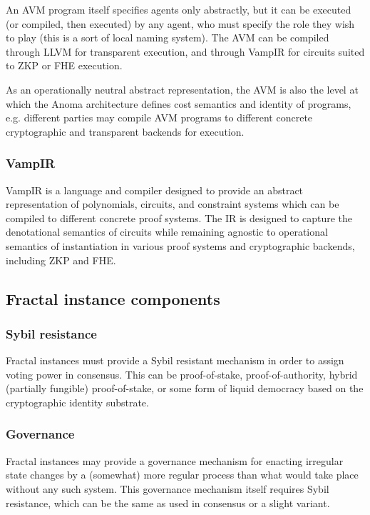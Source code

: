 \documentclass[
    9pt,            %
    commun,        %
    affiltop,       %
]{art}
\begin{document}
An AVM program itself specifies agents only abstractly, but it can be
executed (or compiled, then executed) by any agent, who must specify the
role they wish to play (this is a sort of local naming system). The AVM
can be compiled through LLVM for transparent execution, and through
VampIR for circuits suited to ZKP or FHE execution.

As an operationally neutral abstract representation, the AVM is also the
level at which the Anoma architecture defines cost semantics and
identity of programs, e.g. different parties may compile AVM programs to
different concrete cryptographic and transparent backends for execution.

\subsubsection{VampIR}\label{vampir}

VampIR is a language and compiler designed to provide an abstract
representation of polynomials, circuits, and constraint systems which
can be compiled to different concrete proof systems. The IR is designed
to capture the denotational semantics of circuits while remaining
agnostic to operational semantics of instantiation in various proof
systems and cryptographic backends, including ZKP and FHE.

\subsection{Fractal instance
components}\label{fractal-instance-components}

\subsubsection{Sybil resistance}\label{sybil-resistance}

Fractal instances must provide a Sybil resistant mechanism in order to
assign voting power in consensus. This can be proof-of-stake,
proof-of-authority, hybrid (partially fungible) proof-of-stake, or some
form of liquid democracy based on the cryptographic identity substrate.

\subsubsection{Governance}\label{governance}

Fractal instances may provide a governance mechanism for enacting
irregular state changes by a (somewhat) more regular process than what
would take place without any such system. This governance mechanism
itself requires Sybil resistance, which can be the same as used in
consensus or a slight variant.
\end{document}

